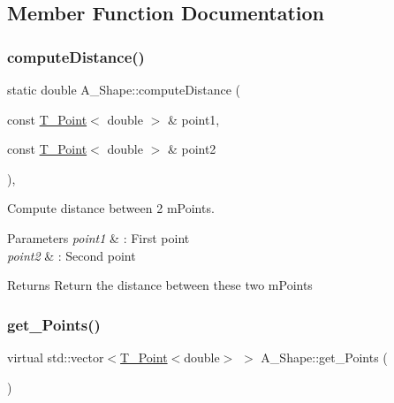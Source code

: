 \subsection{Member Function Documentation}
\mbox{\label{classShape_aadd5fcb0535a62f4ed4dcfb39e86336a}} 
\subsubsection{\texorpdfstring{compute\+Distance()}{computeDistance()}}
{\footnotesize\ttfamily static double A_Shape\+::compute\+Distance (\begin{DoxyParamCaption}\item[{const \hyperlink{classPoint}{T_Point}$<$ double $>$ \&}]{point1,  }\item[{const \hyperlink{classPoint}{T_Point}$<$ double $>$ \&}]{point2 }\end{DoxyParamCaption})\hspace{0.3cm}{\ttfamily [inline]}, {\ttfamily [static]}}



Compute distance between 2 mPoints.


\begin{DoxyParams}{Parameters}
{\em point1} & \+: First point \\
\hline
{\em point2} & \+: Second point \\
\hline
\end{DoxyParams}
\begin{DoxyReturn}{Returns}
Return the distance between these two mPoints
\end{DoxyReturn}
\mbox{\label{classShape_add74a5c682840fa4a519242b1ddbd0b5}} 
\subsubsection{\texorpdfstring{get\+\_\+\+Points()}{get\_Points()}}
{\footnotesize\ttfamily virtual std\+::vector$<$\hyperlink{classPoint}{T_Point}$<$double$>$ $>$ A_Shape\+::get\+\_\+\+Points (\begin{DoxyParamCaption}{ }\end{DoxyParamCaption})\hspace{0.3cm}{\ttfamily [pure virtual]}}



